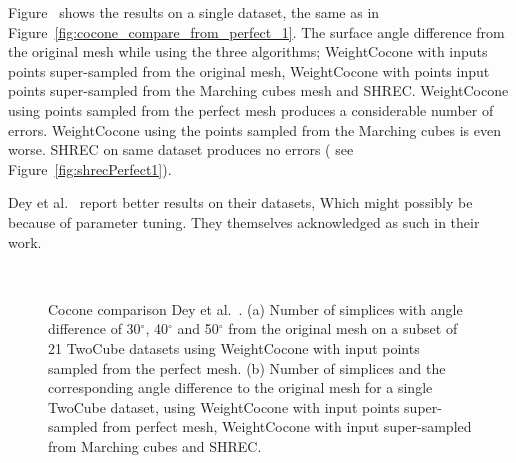 Figure~\protect{} shows the results on a single dataset, the same as in Figure~\ref{fig:cocone_compare_from_perfect_1}. The surface angle difference from the original mesh while using the three algorithms; WeightCocone with inputs points super-sampled from the original mesh, WeightCocone with points input points super-sampled from the Marching cubes mesh and SHREC. 
WeightCocone using points sampled from the perfect mesh produces a considerable number of errors. WeightCocone using the points sampled from the Marching cubes is even worse. 
SHREC on same dataset produces no errors ( see Figure~\ref{fig:shrecPerfect1}). 

Dey et al.~\cite{Dey2012,Dey2013} report better results on their datasets, Which might possibly be because of parameter tuning. They themselves acknowledged as such in their work.
\begin{figure}[tb]
	\centering
		\\
		\caption{Cocone comparison Dey et al.~\cite{Dey2012,Dey2013}. (a) Number of simplices with angle difference of 30$^\circ$, 40$^\circ$ and 50$^\circ$ from the original mesh on a subset of 21 TwoCube datasets using WeightCocone with  input points sampled from the perfect mesh. (b) Number of simplices and the corresponding angle difference to the original mesh for a single TwoCube dataset, using WeightCocone with input points super-sampled from perfect mesh, WeightCocone with input super-sampled from Marching cubes and SHREC.}
\end{figure}
